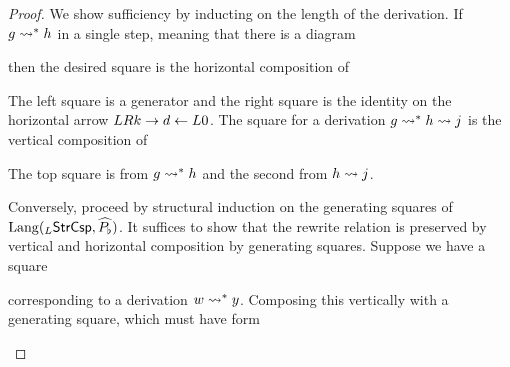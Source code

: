 \documentclass{amsart}
\begin{document}
\begin{proof}
  We show sufficiency by inducting on the length of the
  derivation. If $ g \rightsquigarrow^\ast h $ in a single step, meaning
  that there is a diagram
  
  then the desired square is the horizontal composition of
  
  
  The left square is a generator and the right square is the
  identity on the horizontal arrow $ LRk \to d \leftarrow L0
  $. The square for a derivation
  $ g \rightsquigarrow^\ast h \rightsquigarrow j $ is the vertical composition
  of
  
  
  The top square is from $ g \rightsquigarrow^\ast h $ and the second
  from $ h \rightsquigarrow j $.

  Conversely, proceed by structural induction on the
  generating squares of
  $ \mathrm{Lang} ( _{L}\mathsf{StrCsp} , \widehat{P_\flat} ) $.  It suffices to
  show that the rewrite relation is preserved by vertical
  and horizontal composition by generating squares.  Suppose
  we have a square
  \begin{center}\end{center}
  corresponding to a derivation $ w \rightsquigarrow^\ast y $. Composing
  this vertically with a generating square, which must have
  form
  \begin{center}
\end{center}
\end{proof}
\end{document}
